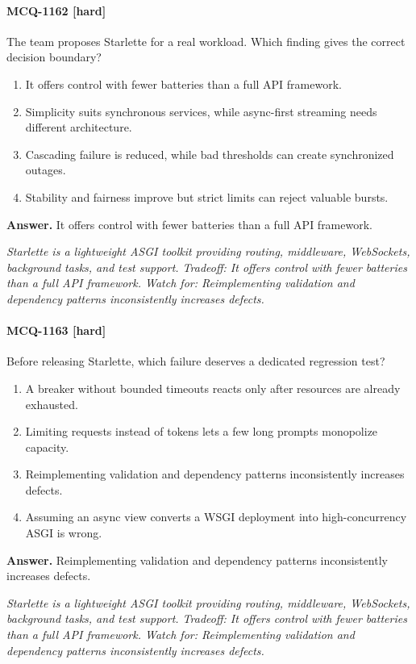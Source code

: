 \paragraph{MCQ-1162 [hard]} The team proposes Starlette for a real workload. Which finding gives the correct decision boundary?
\begin{enumerate}[label=\Alph*.]
\item It offers control with fewer batteries than a full API framework.
\item Simplicity suits synchronous services, while async-first streaming needs different architecture.
\item Cascading failure is reduced, while bad thresholds can create synchronized outages.
\item Stability and fairness improve but strict limits can reject valuable bursts.
\end{enumerate}
\noindent\textbf{Answer.} It offers control with fewer batteries than a full API framework.
\par\textit{Starlette is a lightweight ASGI toolkit providing routing, middleware, WebSockets, background tasks, and test support. Tradeoff: It offers control with fewer batteries than a full API framework. Watch for: Reimplementing validation and dependency patterns inconsistently increases defects.}
\paragraph{MCQ-1163 [hard]} Before releasing Starlette, which failure deserves a dedicated regression test?
\begin{enumerate}[label=\Alph*.]
\item A breaker without bounded timeouts reacts only after resources are already exhausted.
\item Limiting requests instead of tokens lets a few long prompts monopolize capacity.
\item Reimplementing validation and dependency patterns inconsistently increases defects.
\item Assuming an async view converts a WSGI deployment into high-concurrency ASGI is wrong.
\end{enumerate}
\noindent\textbf{Answer.} Reimplementing validation and dependency patterns inconsistently increases defects.
\par\textit{Starlette is a lightweight ASGI toolkit providing routing, middleware, WebSockets, background tasks, and test support. Tradeoff: It offers control with fewer batteries than a full API framework. Watch for: Reimplementing validation and dependency patterns inconsistently increases defects.}
